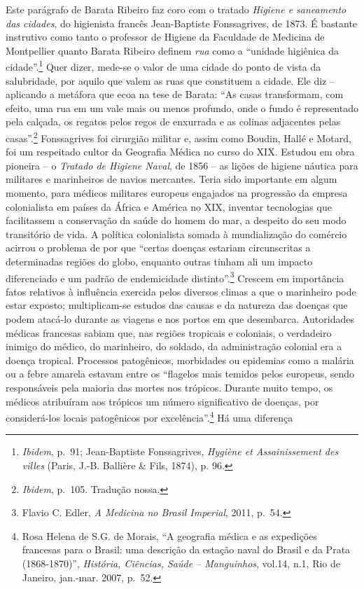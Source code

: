 Este parágrafo de Barata Ribeiro faz coro com o tratado \emph{Higiene e
saneamento das cidades}, do higienista francês Jean-Baptiste
Fonssagrives, de 1873. É bastante instrutivo como tanto o professor de
Higiene da Faculdade de Medicina de Montpellier quanto Barata Ribeiro
definem \emph{rua} como a ``unidade higiênica da cidade''.\footnote{\emph{Ibidem},
  p.~91; Jean-Baptiste Fonssagrives, \emph{Hygiène et Assainissement des
  villes} (Paris, J.-B. Ballière \& Fils, 1874), p. 96.} Quer dizer,
mede-se o valor de uma cidade do ponto de vista da salubridade, por
aquilo que valem as ruas que constituem a cidade. Ele diz -- aplicando a
metáfora que ecoa na tese de Barata: ``As casas transformam, com efeito,
uma rua em um vale mais ou menos profundo, onde o fundo é representado
pela calçada, os regatos pelos regos de enxurrada e as colinas
adjacentes pelas casas''.\footnote{\emph{Ibidem}, p.~105. Tradução
  nossa.} Fonssagrives foi cirurgião militar e, assim como Boudin, Hallé
e Motard, foi um respeitado cultor da Geografia Médica no curso do XIX.
Estudou em obra pioneira -- o \emph{Tratado de Higiene Naval}, de 1856
-- as lições de higiene náutica para militares e marinheiros de navios
mercantes. Teria sido importante em algum momento, para médicos
militares europeus engajados na progressão da empresa colonialista em
países da África e América no XIX, inventar tecnologias que facilitassem
a conservação da saúde do homem do mar, a despeito do seu modo
transitório de vida. A política colonialista somada à mundialização do
comércio acirrou o problema de por que ``certas doenças estariam
circunscritas a determinadas regiões do globo, enquanto outras tinham
ali um impacto diferenciado e um padrão de endemicidade
distinto''.\footnote{Flavio C. Edler, \emph{A Medicina no Brasil
  Imperial}, 2011, p.~54.} Crescem em importância fatos relativos à
influência exercida pelos diversos climas a que o marinheiro pode estar
exposto; multiplicam-se estudos das causas e da natureza das doenças que
podem atacá-lo durante as viagens e nos portos em que desembarca.
Autoridades médicas francesas sabiam que, nas regiões tropicais e
coloniais, o verdadeiro inimigo do médico, do marinheiro, do soldado, da
administração colonial era a doença tropical. Processos patogênicos,
morbidades ou epidemias como a malária ou a febre amarela estavam entre
os ``flagelos mais temidos pelos europeus, sendo responsáveis pela
maioria das mortes nos trópicos. Durante muito tempo, os médicos
atribuíram aos trópicos um número significativo de doenças, por
considerá-los locais patogênicos por excelência''.\footnote{Rosa Helena
  de S.G. de Morais, ``A geografia médica e as expedições francesas para
  o Brasil: uma descrição da estação naval do Brasil e da Prata
  (1868-1870)'', \emph{História, Ciências, Saúde -- Manguinhos}, vol.14,
  n.1, Rio de Janeiro, jan.-mar. 2007, p.~52.} Há uma diferença
